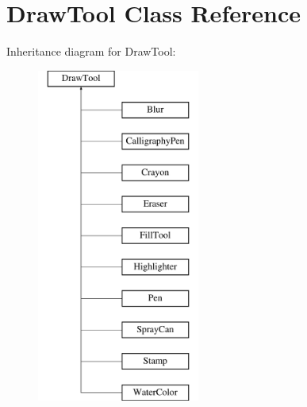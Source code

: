 \hypertarget{classDrawTool}{}\section{Draw\+Tool Class Reference}
\label{classDrawTool}
Inheritance diagram for Draw\+Tool\+:\begin{figure}[H]
\begin{center}
\leavevmode
\includegraphics[height=11.000000cm]{classDrawTool}
\end{center}
\end{figure}
